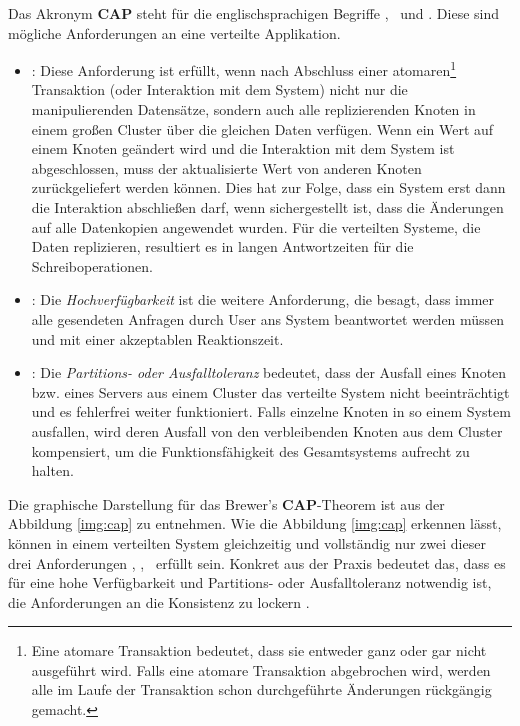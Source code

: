 Das Akronym \textbf{CAP} steht für die englischsprachigen Begriffe  \Cap, \cAp\ und \caP. Diese sind mögliche Anforderungen an eine verteilte Applikation.
\begin{itemize}
\item \Cap: Diese Anforderung ist erfüllt, wenn nach Abschluss einer atomaren\footnote{Eine atomare Transaktion bedeutet, dass sie entweder ganz oder gar nicht ausgeführt wird. Falls eine atomare Transaktion abgebrochen wird, werden alle im Laufe der Transaktion schon durchgeführte Änderungen rückgängig gemacht.} Transaktion (oder Interaktion mit dem System) nicht nur die manipulierenden Datensätze, sondern auch alle replizierenden Knoten in einem großen Cluster über die gleichen Daten verfügen. Wenn ein Wert auf einem Knoten geändert wird und die Interaktion mit dem System ist abgeschlossen, muss der aktualisierte Wert von anderen Knoten zurückgeliefert werden können. Dies hat zur Folge, dass ein System erst dann die Interaktion abschließen darf, wenn sichergestellt ist, dass die Änderungen auf alle Datenkopien angewendet wurden. Für die verteilten Systeme, die Daten replizieren, resultiert es in langen Antwortzeiten für die Schreiboperationen.

\item \cAp: Die \textit{Hochverfügbarkeit} ist die weitere Anforderung, die besagt, dass immer alle gesendeten Anfragen durch User ans System beantwortet werden müssen und mit einer akzeptablen Reaktionszeit.

\item \caP: Die \textit{Partitions- oder Ausfalltoleranz} bedeutet, dass der Ausfall eines Knoten bzw. eines Servers aus einem Cluster das verteilte System nicht beeinträchtigt und es fehlerfrei weiter funktioniert. Falls einzelne Knoten in so einem System ausfallen, wird deren Ausfall von den verbleibenden Knoten aus dem Cluster kompensiert, um die Funktionsfähigkeit des Gesamtsystems aufrecht zu halten.

\end{itemize}

Die graphische Darstellung für das Brewer's \textbf{CAP}-Theorem ist aus der Abbildung \ref{img:cap} zu entnehmen. Wie die Abbildung \ref{img:cap} erkennen lässt, können in einem verteilten System gleichzeitig und vollständig nur zwei dieser drei Anforderungen  \Cap, \cAp, \caP\ erfüllt sein. Konkret aus der Praxis bedeutet das, dass es für eine hohe Verfügbarkeit und Partitions- oder Ausfalltoleranz notwendig ist, die Anforderungen an die Konsistenz zu lockern \cite[S. 31]{Edlich.2011}.


